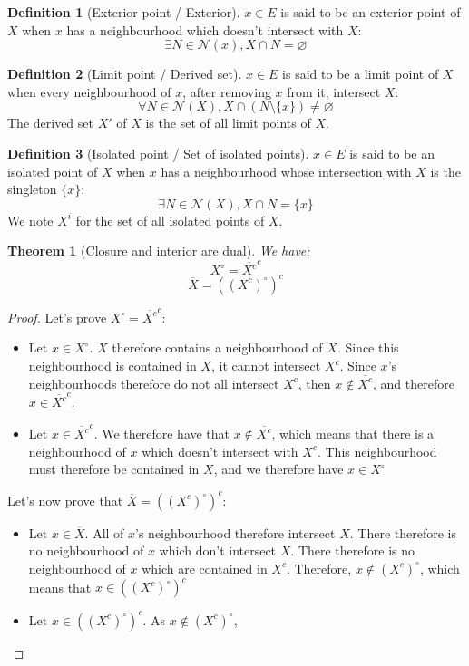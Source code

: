 \documentclass{article}
\newtheorem{theorem}{Theorem}[section]
\theoremstyle{definition}
\newtheorem{definition}{Definition}[section]
\theoremstyle{remark}
\theoremstyle{example}
\theoremstyle{notation}
\newcommand{\inter}[1]{{{#1}^\circ}}
\begin{document}
\begin{definition}[Exterior point / Exterior]
		$x \in E$ is said to be an exterior point of $X$ when $x$ has a neighbourhood which doesn't intersect with $X$:
				$$\exists N \in \mathcal{N}(x), X \cap N = \varnothing$$
\end{definition}

\begin{definition}[Limit point / Derived set]
		$x \in E$ is said to be a limit point of $X$ when every neighbourhood of $x$, after removing $x$ from it, intersect $X$:
				$$\forall N \in \mathcal{N}(X), X \cap (N \setminus \{x\}) \neq \varnothing$$
		The derived set $X'$ of $X$ is the set of all limit points of $X$.
\end{definition}

\begin{definition}[Isolated point / Set of isolated points]
		$x \in E$ is said to be an isolated point of $X$ when $x$ has a neighbourhood whose intersection with $X$ is the singleton $\{x\}$:
				$$\exists N \in \mathcal{N}(X), X \cap N = \{x\}$$
		We note $X^i$ for the set of all isolated points of $X$.
\end{definition}

\begin{theorem}[Closure and interior are dual]
		We have:
				$$\inter{X} = \overline{X^c}^c$$
				$$\overline{X} = (\inter{(X^c)})^c$$
\end{theorem}

\begin{proof}
		Let's prove $\inter{X} = \overline{X^c}^c$:
		\begin{itemize}
				\item Let $x \in \inter{X}$. $X$ therefore contains a neighbourhood of $X$. Since this neighbourhood is contained in $X$, it cannot intersect $X^c$. Since $x$'s neighbourhoods therefore do not all intersect $X^c$, then $x \notin \overline{X^c}$, and therefore $x \in \overline{X^c}^c$.
				\item Let $x \in \overline{X^c}^c$. We therefore have that $x \notin \overline{X^c}$, which means that there is a neighbourhood of $x$ which doesn't intersect with $X^c$. This neighbourhood must therefore be contained in $X$, and we therefore have $x \in \inter{X}$
		\end{itemize}
		Let's now prove that $\overline{X} = (\inter{(X^c)})^c$:
		\begin{itemize}
				\item Let $x \in \overline{X}$. All of $x$'s neighbourhood therefore intersect $X$. There therefore is no neighbourhood of $x$ which don't intersect $X$. There therefore is no neighbourhood of $x$ which are contained in $X^c$. Therefore, $x \notin \inter{(X^c)}$, which means that $x \in (\inter{(X^c)})^c$
				\item Let $x \in (\inter{(X^c)})^c$. As $x \notin \inter{(X^c)}$, 
		\end{itemize}
\end{proof}
\end{document}
